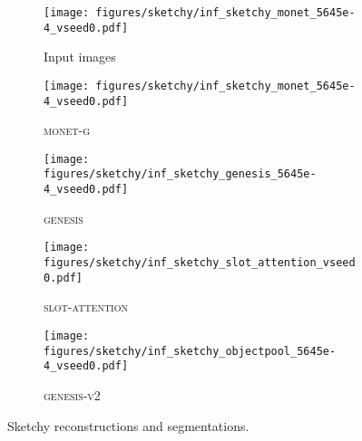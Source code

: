 \documentclass{article}
\begin{document}
\begin{figure}[h!]
	\centering
	\begin{subfigure}{\linewidth}
	    \texttt{[image: figures/sketchy/inf\_sketchy\_monet\_5645e-4\_vseed0.pdf]}
	    \caption{Input images}
	    \vspace{6pt}
	\end{subfigure}
	\begin{subfigure}{\linewidth}
	    \texttt{[image: figures/sketchy/inf\_sketchy\_monet\_5645e-4\_vseed0.pdf]}
	    \caption{\textsc{monet-g}}
	    \vspace{6pt}
	\end{subfigure}
	\begin{subfigure}{\linewidth}
	    \texttt{[image: figures/sketchy/inf\_sketchy\_genesis\_5645e-4\_vseed0.pdf]}
	    \caption{\textsc{genesis}}
	    \vspace{6pt}
	\end{subfigure}
	\begin{subfigure}{\linewidth}
	    \texttt{[image: figures/sketchy/inf\_sketchy\_slot\_attention\_vseed0.pdf]}
	    \caption{\textsc{slot-attention}}
	    \vspace{6pt}
	\end{subfigure}
	\begin{subfigure}{\linewidth}
	    \texttt{[image: figures/sketchy/inf\_sketchy\_objectpool\_5645e-4\_vseed0.pdf]}
	    \caption{\textsc{genesis-v2}}
	\end{subfigure}
	\caption{Sketchy reconstructions and segmentations.}
\end{figure}
\end{document}
